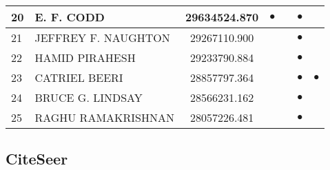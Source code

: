 \documentclass[12pt,titlepage]{report}
\begin{document}
\begin{center}
\begin{tabular}{|l|l|c|c|c|c|c|}
\hline
20 & E. F. CODD & 29634524.870& $\bullet$ & & $\bullet$ &           \\
\hline
21 & JEFFREY F. NAUGHTON & 29267110.900&&         &$\bullet$&         \\
\hline
22 & HAMID PIRAHESH & 29233790.884&&         &$\bullet$&         \\
\hline
23 & CATRIEL BEERI & 28857797.364&         &         &$\bullet$&$\bullet$\\
\hline
24 & BRUCE G. LINDSAY & 28566231.162&         &         &$\bullet$&         \\
\hline
25 & RAGHU RAMAKRISHNAN & 28057226.481 &&         &$\bullet$&         \\
\hline
\end{tabular}
\end{center}



\subsection{CiteSeer}
\end{document}
